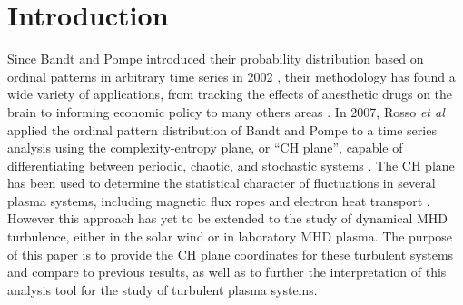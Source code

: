 \documentclass[aps,pre,twocolumn,secnumarabic,nobalancelastpage,amsmath,amssymb,
nofootinbib]{revtex4-1}
\begin{document}
\section{Introduction}
Since Bandt and Pompe introduced their probability distribution based on ordinal patterns in arbitrary time series in 2002 \cite{bandt2002}, their methodology has found a wide variety of applications, from tracking the effects of anesthetic drugs on the brain \cite{li2010,jordan2008,olofsen2008} to informing economic policy \cite{bariviera2013,zunino2010,zunino2011} to many others areas \cite{kowalski2007,soriano2011,saco2010,suyal2012,sun2010}. In 2007, Rosso \textit{et al} applied the ordinal pattern distribution of Bandt and Pompe to a time series analysis using the complexity-entropy plane, or ``CH plane'', capable of differentiating between periodic, chaotic, and stochastic systems \cite{rosso2007}. The CH plane has been used to determine the statistical character of fluctuations in several plasma systems, including magnetic flux ropes \cite{gekelman2014} and electron heat transport \cite{maggs2013}. However this approach has yet to be extended to the study of dynamical MHD turbulence, either in the solar wind or in laboratory MHD plasma. The purpose of this paper is to provide the CH plane coordinates for these turbulent systems and compare to previous results, as well as to further the interpretation of this analysis tool for the study of turbulent plasma systems.
\end{document}
